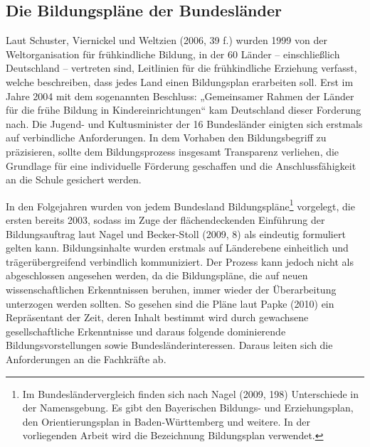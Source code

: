 \subsection{Die Bildungspläne der Bundesländer}
Laut Schuster, Viernickel und Weltzien (2006, 39 f.) wurden 1999 von der Weltorganisation für frühkindliche Bildung, in der 60 Länder -- einschließlich Deutschland -- vertreten sind, Leitlinien für die frühkindliche Erziehung verfasst, welche beschreiben, dass jedes Land einen Bildungsplan erarbeiten soll. Erst im Jahre 2004 mit dem sogenannten Beschluss: „Gemeinsamer Rahmen der Länder für die frühe Bildung in Kindereinrichtungen“ kam Deutschland dieser Forderung nach. Die Jugend- und Kultusminister der 16 Bundesländer einigten sich erstmals auf verbindliche Anforderungen. In dem Vorhaben den Bildungsbegriff zu präzisieren, sollte dem Bildungsprozess insgesamt Transparenz verliehen, die Grundlage für eine individuelle Förderung geschaffen und die Anschlussfähigkeit an die Schule gesichert werden. 

In den Folgejahren wurden von jedem Bundesland Bildungspläne\footnote{Im Bundesländervergleich finden sich nach Nagel (2009, 198) Unterschiede in der Namensgebung. Es gibt den Bayerischen Bildungs- und Erziehungsplan, den Orientierungsplan in Baden-Württemberg und weitere. In der vorliegenden Arbeit wird die Bezeichnung Bildungsplan verwendet.} vorgelegt, die ersten bereits 2003, sodass im Zuge der flächendeckenden Einführung der Bildungsauftrag laut Nagel und Becker-Stoll (2009, 8) als eindeutig formuliert gelten kann. Bildungsinhalte wurden erstmals auf Länderebene einheitlich und trägerübergreifend verbindlich kommuniziert. Der Prozess kann jedoch nicht als abgeschlossen angesehen werden, da die Bildungspläne, die auf neuen wissenschaftlichen Erkenntnissen beruhen, immer wieder der Überarbeitung unterzogen werden sollten. So gesehen sind die Pläne laut Papke (2010) ein Repräsentant der Zeit, deren Inhalt bestimmt wird durch gewachsene gesellschaftliche Erkenntnisse und daraus folgende dominierende Bildungsvorstellungen sowie Bundesländerinteressen. Daraus leiten sich die Anforderungen an die Fachkräfte ab. 

